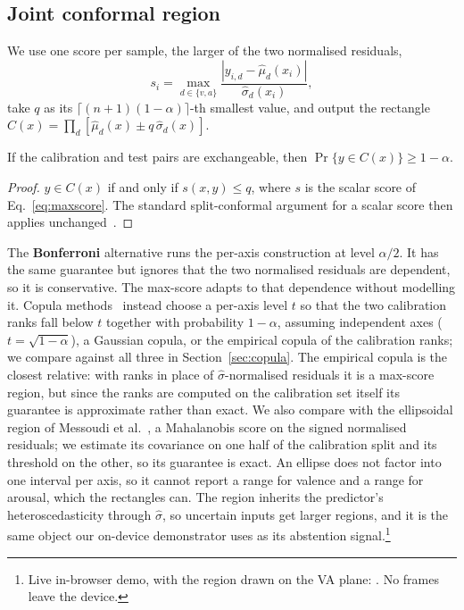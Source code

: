 \subsection{Joint conformal region}
We use one score per sample, the larger of the two normalised residuals,
\begin{equation}
  s_i=\max_{d\in\{v,a\}}\frac{|y_{i,d}-\hat\mu_d(x_i)|}{\hat\sigma_d(x_i)},
  \label{eq:maxscore}
\end{equation}
take $q$ as its $\lceil(n{+}1)(1-\alpha)\rceil$-th smallest value, and output the
rectangle $C(x)=\prod_{d}[\hat\mu_d(x)\pm q\,\hat\sigma_d(x)]$.

\begin{proposition}\label{prop:joint}
If the calibration and test pairs are exchangeable, then
$\Pr\{y\in C(x)\}\ge 1-\alpha$.
\end{proposition}
\begin{proof}
$y\in C(x)$ if and only if $s(x,y)\le q$, where $s$ is the scalar score of
Eq.~\eqref{eq:maxscore}. The standard split-conformal argument for a scalar score
then applies unchanged~\cite{lei2018distribution}.
\end{proof}

The \textbf{Bonferroni} alternative runs the per-axis construction at level
$\alpha/2$. It has the same guarantee but ignores that the two normalised
residuals are dependent, so it is conservative. The max-score adapts to that
dependence without modelling it. Copula
methods~\cite{messoudi2021copula} instead choose a per-axis level $t$ so that
the two calibration ranks fall below $t$ together with probability $1-\alpha$,
assuming independent axes ($t=\sqrt{1-\alpha}$), a Gaussian copula, or the
empirical copula of the calibration ranks; we compare against all three in
Section~\ref{sec:copula}. The empirical copula is the closest relative: with
ranks in place of $\hat\sigma$-normalised residuals it is a max-score region,
but since the ranks are computed on the calibration set itself its guarantee is
approximate rather than exact. We also compare with the ellipsoidal region of
Messoudi et al.~\cite{messoudi2022ellipsoidal}, a Mahalanobis score on the signed
normalised residuals; we estimate its covariance on one half of the calibration
split and its threshold on the other, so its guarantee is exact. An ellipse
does not factor into one interval per axis, so it cannot report a range for
valence and a range for arousal, which the rectangles can. The region inherits the predictor's
heteroscedasticity through $\hat\sigma$, so uncertain inputs get larger regions,
and it is the same object our on-device demonstrator uses as its abstention
signal.\footnote{Live in-browser demo, with the region drawn on the VA plane:
\demourl. No frames leave the device.}

